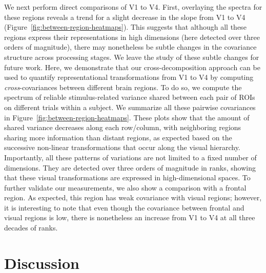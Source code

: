 \documentclass[10pt]{article}
\begin{document}
We next perform direct comparisons of V1 to V4. First, overlaying the spectra for these regions reveals a trend for a slight decrease in the slope from V1 to V4 (Figure~\ref{fig:between-region-heatmaps}). This suggests that although all these regions express their representations in high dimensions (here detected over three orders of magnitude), there may nonetheless be subtle changes in the covariance structure across processing stages. We leave the study of these subtle changes for future work. Here, we demonstrate that our cross-decomposition approach can be used to quantify representational transformations from V1 to V4 by computing \emph{cross}-covariances between different brain regions. To do so, we compute the spectrum of reliable stimulus-related variance shared between each pair of ROIs on different trials within a subject. We summarize all these pairwise covariances in Figure~\ref{fig:between-region-heatmaps}. These plots show that the amount of shared variance decreases along each row/column, with neighboring regions sharing more information than distant regions, as expected based on the successive non-linear transformations that occur along the visual hierarchy. Importantly, all these patterns of variations are not limited to a fixed number of dimensions. They are detected over three orders of magnitude in ranks, showing that these visual transformations are expressed in high-dimensional spaces. To further validate our measurements, we also show a comparison with a frontal region. As expected, this region has weak covariance with visual regions; however, it is interesting to note that even though the covariance between frontal and visual regions is low, there is nonetheless an increase from V1 to V4 at all three decades of ranks.

\section{Discussion}\label{discussion}
\end{document}
